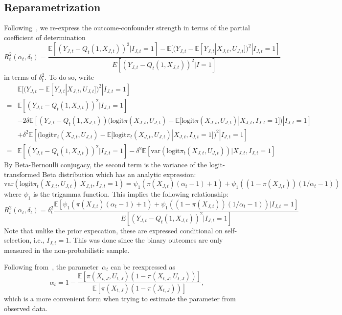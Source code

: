 \documentclass[12pt]{amsart}
\numberwithin{equation}{section}
\theoremstyle{plain}
\def\logit{\text{logit}}
\def\EE{\mathbb{E}}
\begin{document}
\subsection{Reparametrization}

Following~\cite{Veitch2020}, we re-express the outcome-confounder strength in terms of the partial coefficient of determination
$$
R_t^2 (\alpha_t, \delta_t) = \frac{\EE [( Y_{J,t} - Q_t(1,X_{J,t}) )^2 | I_{J,t}=1 ] - \EE[ (Y_{J,t} - \EE[ Y_{J,t} | X_{J,t}, U_{J,t} ])^2 | I_{J,t} = 1]}{E[(Y_{J,t} - Q_t(1,X_{J,t}))^2 | I = 1]}
$$
in terms of $\delta_t^2$. To do so, write
\begin{align*}
&\EE [ (Y_{J,t} - \EE[ Y_{J,t} | X_{J,t}, U_{J,t}] )^2 | I_{J,t} = 1 ] \\
= &\EE [ (Y_{J,t} - Q_t(1,X_{J,t}))^2 | I_{J,t} = 1 ] \\
&- 2 \delta \EE \left[ (Y_{J,t} - Q_t(1,X_{J,t})) (\logit \pi(X_{J,t},U_{J,t}) - \EE[ \logit \pi (X_{J,t},U_{J,t}) | X_{J,t}, I_{J,t}=1 ]) | I_{J,t} = 1 \right] \\
&+ \delta^2 \EE \left[ (\logit \pi_t(X_{J,t},U_{J,t}) - \EE[ \logit \pi_t (X_{J,t},U_{J,t}) | X_{J,t}, I_{J,t}=1 ])^2 | I_{J,t} = 1 \right] \\
= &\EE [ (Y_{J,t} - Q_t(1,X_{J,t}))^2 | I_{J,t} = 1 ] - \delta^2 \EE \left[ \text{var} \left( \logit \pi_t(X_{J,t},U_{J,t}) \right) | X_{J,t}, I_{J,t} = 1 \right]
\end{align*}
By Beta-Bernoulli conjugacy, the second term is the variance of the logit-transformed Beta distribution which has an analytic expression:
$$
\text{var} \left( \logit \pi_t(X_{J,t},U_{J,t}) | X_{J,t}, I_{J,t} = 1 \right) = \psi_1 ( \pi(X_{J,t}) (\alpha_t - 1) + 1 ) + \psi_1 ( (1- \pi(X_{J,t})) (1/\alpha_t - 1))
$$
where $\psi_1$ is the trigamma function. This implies the following relationship:
\begin{equation}
\label{eq:partialcoef}
R_t^2 (\alpha_t, \delta_t) = \delta_t^2 \frac{\EE [\psi_1 ( \pi(X_{J,t}) (\alpha_t - 1) + 1 ) + \psi_1 ( (1- \pi(X_{J,t})) (1/\alpha_t - 1)) | I_{J,t} = 1 ] }{E [(Y_{J,t}- Q_t(1,X_{J,t}))^2 | I_{J,t} = 1]}
\end{equation}
Note that unlike the prior expecation, these are expressed conditional on self-selection, i.e., $I_{J,t} = 1$.  This was done since the binary outcomes are only measured in the non-probabilistic sample.

Following from~\cite[Theorem 5]{Veitch2020}, the parameter~$\alpha_t$ can be reexpressed as
\begin{equation}
\label{eq:alphaest}
\alpha_t = 1 - \frac{\EE \left[ \pi (X_{t,J},U_{t,J}) \left( 1 - \pi (X_{t,J},U_{t,J}) \right)  \right]}{\EE\left[ \pi (X_{t,J}) \left( 1 - \pi (X_{t,J}) \right) \right] },
\end{equation}
which is a more convenient form when trying to estimate the parameter from observed data.
\end{document}
